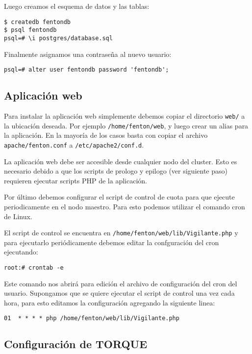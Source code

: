 \documentclass[a4paper,10pt,spanish]{article}
\begin{document}
Luego creamos el esquema de datos y las tablas:

\begin{verbatim}
$ createdb fentondb 
$ psql fentondb
psql=# \i postgres/database.sql
\end{verbatim}

Finalmente asignamos una contrase\~{n}a al nuevo usuario:

\begin{verbatim}
psql=# alter user fentondb password 'fentondb';
\end{verbatim}

\subsection{Aplicaci\'{o}n web}

Para instalar la aplicaci\'{o}n web simplemente debemos copiar el directorio \mbox{\texttt{web/}} a la ubicaci\'{o}n deseada. Por ejemplo \mbox{\texttt{/home/fenton/web}}, y luego crear un alias para la aplicaci\'{o}n. En la mayor\'{i}a de los casos basta con copiar el archivo \mbox{\texttt{apache/fenton.conf}} a \mbox{\texttt{/etc/apache2/conf.d}}.

La aplicaci\'{o}n web debe ser accesible desde cualquier nodo del cluster. Esto es necesario debido a que los scripts de prologo y epilogo (ver siguiente paso) requieren ejecutar scripts PHP de la aplicaci\'{o}n.

Por \'{u}ltimo debemos configurar el script de control de cuota para que ejecute periodicamente en el nodo maestro. Para esto podemos utilizar el comando cron de Linux. 

El script de control se encuentra en \mbox{\texttt{/home/fenton/web/lib/Vigilante.php}} y para ejecutarlo peri\'{o}dicamente debemos editar la confguraci\'{o}n del cron ejecutando:

\begin{verbatim}
root:# crontab -e
\end{verbatim}

Este comando nos abrir\'{a} para edici\'{o}n el archivo de configuraci\'{o}n del cron del usuario. Supongamos que se quiere ejecutar el script de control una vez cada hora, para esto editamos la configuraci\'{o}n agregando la siguiente linea:

\begin{verbatim}
01  * * * * php /home/fenton/web/lib/Vigilante.php
\end{verbatim}

\subsection{Configuraci\'{o}n de TORQUE}
\end{document}
